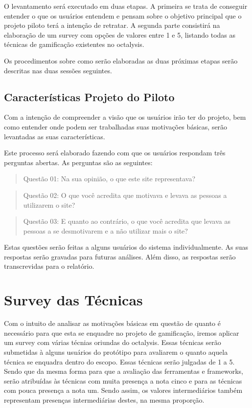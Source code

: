 O levantamento será executado em duas etapas. A primeira se trata de conseguir entender o que os usuários entendem e pensam sobre o objetivo
principal que o projeto piloto terá a intenção de retratar. A segunda parte consistirá na elaboração de um survey com opções de valores entre 1 e 5,
listando todas as técnicas de gamificação existentes no octalysis.

Os procedimentos sobre como serão elaboradas as duas próximas etapas serão descritas nas duas sessões seguintes. 

\subsection{Características Projeto do Piloto}
\label{sub:caracter_sticas_projeto_do_piloto}
Com a intenção de compreender a visão que os usuários irão ter do projeto, bem como entender onde podem ser trabalhadas suas motivações básicas,
serão levantadas as suas características.

Este processo será elaborado fazendo com que os usuários respondam três perguntas abertas. As perguntas são as seguintes:

\begin{quotation}
    Questão 01: Na sua opinião, o que este site representava?
\end{quotation}

\begin{quotation}
    Questão 02: O que você acredita que motivava e levava as pessoas a utilizarem o site?
\end{quotation}

\begin{quotation}
    Questão 03: E quanto ao contrário, o que você acredita que levava as pessoas a se desmotivarem e a não
    utilizar mais o site?
\end{quotation}

Estas questões serão feitas a alguns usuários do sistema individualmente. As suas respostas serão gravadas para futuras análises.
Além disso, as respostas serão transcrevidas para o relatório.

\section{Survey das Técnicas}
\label{sub:survey_das_t_cnicas}
Com o intuito de analisar as motivações básicas em questão de quanto é necessário para que esta se enquadre no projeto
de gamificação, iremos aplicar um survey com várias técnias oriundas do octalysis. Essas técnicas serão submetidas à alguns
usuários do protótipo para avaliarem o quanto aquela técnica se enquadra dentro do escopo. Essas técnicas serão julgadas de 1
a 5. Sendo que da mesma forma para que a avaliação das ferramentas e frameworks, serão atribuídas às técnicas com
muita presença a nota cinco e para as técnicas com pouca presença a nota um. Sendo assim, os valores intermediários
também representam presenças intermediárias destes, na mesma proporção.

